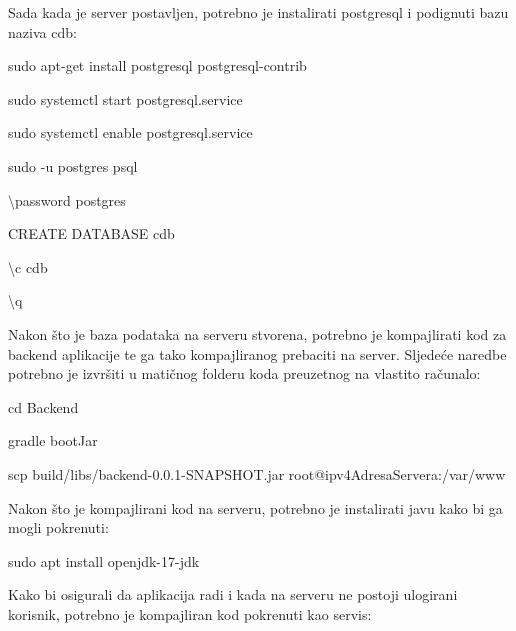                 {Sada kada je server postavljen, potrebno je instalirati postgresql i podignuti bazu naziva cdb:}

                \begin{packed_item}
        			\item {sudo apt-get install postgresql postgresql-contrib}
        			\item {sudo systemctl start postgresql.service}
        			\item {sudo systemctl enable postgresql.service}
        			\item {sudo -u postgres psql}
        			\item {\textbackslash password postgres}
        			\item {CREATE DATABASE cdb}
        			\item {\textbackslash c cdb}
        			\item {\textbackslash q}
        		\end{packed_item}

                {Nakon što je baza podataka na serveru stvorena, potrebno je kompajlirati kod za backend aplikacije te ga tako kompajliranog prebaciti na server. Sljedeće naredbe potrebno je izvršiti u matičnog folderu koda preuzetnog na vlastito računalo:}

                \begin{packed_item}
        			\item {cd Backend}
        			\item {gradle bootJar}
        			\item {scp build/libs/backend-0.0.1-SNAPSHOT.jar root@ipv4AdresaServera:/var/www}
        		\end{packed_item}

                {Nakon što je kompajlirani kod na serveru, potrebno je instalirati javu kako bi ga mogli pokrenuti:}

                \begin{packed_item}
        			\item {sudo apt install openjdk-17-jdk}
        		\end{packed_item}

                {Kako bi osigurali da aplikacija radi i kada na serveru ne postoji ulogirani korisnik, potrebno je kompajliran kod pokrenuti kao servis:}


